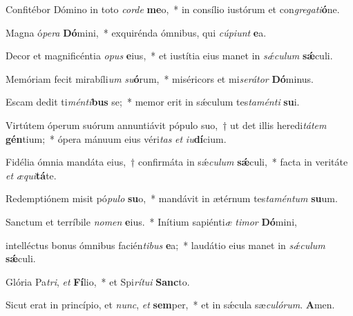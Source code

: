 \item Confitébor Dómino in toto \textit{corde} \textbf{me}o,~* in consílio iustórum et con\textit{gregati}\textbf{ó}ne.

\item Magna ó\textit{pera} \textbf{Dó}mini,~* exquirénda ómnibus, qui \textit{cúpiunt} \textbf{e}a.

\item Decor et magnificéntia \textit{opus} \textbf{e}ius,~* et iustítia eius manet in \textit{sǽculum} \textbf{sǽ}culi.

\item Memóriam fecit mirabíli\textit{um} \textit{su}\textbf{ó}rum,~* miséricors et mi\textit{serátor} \textbf{Dó}minus.

\item Escam dedit ti\textit{ménti}\textbf{bus} se;~* memor erit in sǽculum tes\textit{taménti} \textbf{su}i.

\item Virtútem óperum suórum annuntiávit pópulo suo,~† ut det illis heredi\textit{tátem} \textbf{gén}tium;~* ópera mánuum eius véri\textit{tas} \textit{et} \textit{iu}\textbf{dí}cium.

\item Fidélia ómnia mandáta eius,~† confirmáta in sǽ\textit{culum} \textbf{sǽ}culi,~* facta in veritáte \textit{et} \textit{æqui}\textbf{tá}te.

\item Redemptiónem misit pó\textit{pulo} \textbf{su}o,~* mandávit in ætérnum tes\textit{taméntum} \textbf{su}um.

\item Sanctum et terríbile \textit{nomen} \textbf{e}ius.~* Inítium sapiénti\textit{æ} \textit{timor} \textbf{Dó}mini,

\item intelléctus bonus ómnibus facién\textit{tibus} \textbf{e}a;~* laudátio eius manet in \textit{sǽculum} \textbf{sǽ}culi.

\item Glória Pa\textit{tri}, \textit{et} \textbf{Fí}lio,~* et Spi\textit{rítui} \textbf{Sanc}to.

\item Sicut erat in princípio, et \textit{nunc}, \textit{et} \textbf{sem}per,~* et in sǽcula sæ\textit{culórum}. \textbf{A}men.